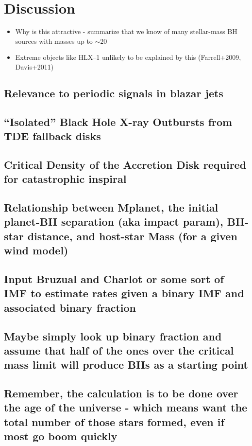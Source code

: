 \section{Discussion}\label{section:conc}

\begin{itemize}
\item Why is this attractive - summarize that we know of  many stellar-mass BH sources with masses up to $\sim20$
\item Extreme objects like HLX--1 unlikely to be explained by this (Farrell+2009, Davis+2011)
\end{itemize}



\subsection{Relevance to periodic signals in blazar jets}


\subsection{``Isolated'' Black Hole X-ray Outbursts from TDE fallback disks} 


\subsection{Critical Density of the Accretion Disk required for catastrophic inspiral}


\subsection{Relationship between Mplanet,  the initial planet-BH separation (aka impact param),  BH-star distance, and host-star Mass (for a given wind model)}


\subsection{Input Bruzual and Charlot or some sort of IMF to estimate rates given a binary IMF and associated binary fraction}


\subsection{Maybe simply look up binary fraction and assume that half of the ones over the critical mass limit will produce BHs as a starting point}


\subsection{Remember, the calculation is to be done over the age of the universe - which means want the total number of those stars formed, even if most go boom quickly} 


